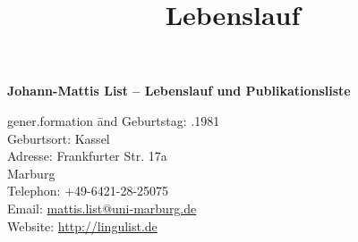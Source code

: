 \documentclass[xetex,11pt,a4paper]{moderncv}
\title{Lebenslauf}
\begin{document}
\pagestyle{plain}


\textbf{Johann-Mattis List -- Lebenslauf und Publikationsliste}\\ 
\noindent\begin{tabbing}
    gener.formation \= and \kill
    \footnotesize Geburtstag:                      .1981 \\
    \footnotesize Geburtsort:                      \> Kassel \\
    \footnotesize Adresse:                         \> Frankfurter Str. 17a \\
    \footnotesize                                  {} Marburg \\
    \footnotesize Telephon:                        \> +49-6421-28-25075 \\
    \footnotesize Email:                           \> \url{mattis.list@uni-marburg.de} \\
    \footnotesize Website:\> \url{http://lingulist.de}\\
\end{tabbing}
\end{document}
